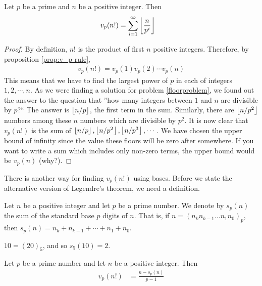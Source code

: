\begin{theorem}\label{thm:legendre}
Let $p$ be a prime and $n$ be a positive integer. Then
\begin{align*}
	v_p(n!) & =\sum_{i=1}^{\infty}\left\lfloor{\dfrac{n}{p^i}}\right\rfloor
\end{align*}
\end{theorem}

\begin{proof}
By definition, $n!$ is the product of first $n$ positive integers. Therefore, by proposition \ref{prop:v_p-rule},
\begin{align*}
	v_p(n!) = v_p(1) v_p(2) \cdots v_p(n)
\end{align*}
This means that we have to find the largest power of $p$ in each of integers $1,2,\cdots, n$. As we were finding a solution for problem \ref{floorproblem}, we found out the answer to the question that ''how many integers between $1$ and $n$ are divisible by $p$?`` The answer is $\left\lfloor{n/p}\right\rfloor$, the first term in the sum. Similarly, there are $\left\lfloor{n/p^2}\right\rfloor$ numbers among these $n$ numbers which are divisible by $p^2$. It is now clear that $v_p(n!)$ is the sum of $\left\lfloor{n/p}\right\rfloor, \left\lfloor{n/p^2}\right\rfloor, \left\lfloor{n/p^3}\right\rfloor, \cdots$. We have chosen the upper bound of infinity since the value these floors will be zero after somewhere. If you want to write a sum which includes only non-zero terms, the upper bound would be $v_p(n)$ (why?).
\end{proof}
There is another way for finding $v_p(n!)$ using bases. Before we state the alternative version of Legendre's theorem, we need a definition.
\begin{definition}
Let $n$ be a positive integer and let $p$ be a prime number.  We denote by $s_p(n)$  the sum of the standard base $p$ digits of $n$. That is, if $n=(n_k n_{k-1}\ldots n_1 n_0)_p$, then $s_p(n)=n_k+ n_{k-1}+\cdots +n_1+ n_0$.
\end{definition}

\begin{example}
$10=(20)_5$, and so $s_5(10)=2$.
\end{example}


\begin{theorem}\label{thm:legendrealternative}
Let $p$ be a prime number and let $n$ be a positive integer. Then
\begin{align*}
	v_p(n!) & =\frac{n-s_p(n)}{p-1}
\end{align*}
\end{theorem}


